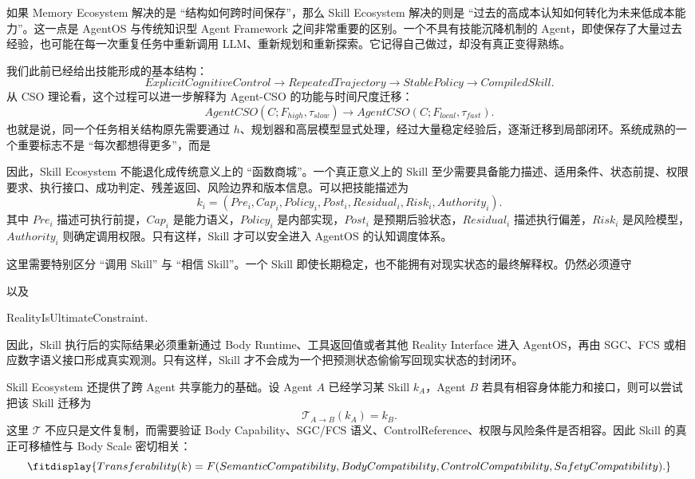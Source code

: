 如果 Memory Ecosystem 解决的是 ``结构如何跨时间保存''，那么 Skill Ecosystem 解决的则是 ``过去的高成本认知如何转化为未来低成本能力''。这一点是 AgentOS 与传统知识型 Agent Framework 之间非常重要的区别。一个不具有技能沉降机制的 Agent，即使保存了大量过去经验，也可能在每一次重复任务中重新调用 LLM、重新规划和重新探索。它记得自己做过，却没有真正变得熟练。

我们此前已经给出技能形成的基本结构：
\[
ExplicitCognitiveControl
\rightarrow
RepeatedTrajectory
\rightarrow
StablePolicy
\rightarrow
CompiledSkill.
\]
从 CSO 理论看，这个过程可以进一步解释为 Agent-CSO 的功能与时间尺度迁移：
\[
AgentCSO(C;F_{high},\tau_{slow})
\rightarrow
AgentCSO(C;F_{local},\tau_{fast}).
\]
也就是说，同一个任务相关结构原先需要通过 $h$、规划器和高层模型显式处理，经过大量稳定经验后，逐渐迁移到局部闭环。系统成熟的一个重要标志不是 ``每次都想得更多''，而是
\begin{statementbox}
\centering
{}
\end{statementbox}

因此，Skill Ecosystem 不能退化成传统意义上的 ``函数商城''。一个真正意义上的 Skill 至少需要具备能力描述、适用条件、状态前提、权限要求、执行接口、成功判定、残差返回、风险边界和版本信息。可以把技能描述为
\[
k_i
=
(
Pre_i,
Cap_i,
Policy_i,
Post_i,
Residual_i,
Risk_i,
Authority_i
).
\]
其中 $Pre_i$ 描述可执行前提，$Cap_i$ 是能力语义，$Policy_i$ 是内部实现，$Post_i$ 是预期后验状态，$Residual_i$ 描述执行偏差，$Risk_i$ 是风险模型，$Authority_i$ 则确定调用权限。只有这样，Skill 才可以安全进入 AgentOS 的认知调度体系。

这里需要特别区分 ``调用 Skill'' 与 ``相信 Skill''。一个 Skill 即使长期稳定，也不能拥有对现实状态的最终解释权。仍然必须遵守
\begin{statementbox}
\centering
{}
\end{statementbox}
以及
\begin{statementbox}
RealityIsUltimateConstraint.
\end{statementbox}
因此，Skill 执行后的实际结果必须重新通过 Body Runtime、工具返回值或者其他 Reality Interface 进入 AgentOS，再由 SGC、FCS 或相应数字语义接口形成真实观测。只有这样，Skill 才不会成为一个把预测状态偷偷写回现实状态的封闭环。

Skill Ecosystem 还提供了跨 Agent 共享能力的基础。设 Agent $A$ 已经学习某 Skill $k_A$，Agent $B$ 若具有相容身体能力和接口，则可以尝试把该 Skill 迁移为
\[
\mathcal T_{A\rightarrow B}(k_A)
=
k_B.
\]
这里 $\mathcal T$ 不应只是文件复制，而需要验证 Body Capability、SGC/FCS 语义、ControlReference、权限与风险条件是否相容。因此 Skill 的真正可移植性与 Body Scale 密切相关：
\[
\fitdisplay{
Transferability(k)
=
F(
SemanticCompatibility,
BodyCompatibility,
ControlCompatibility,
SafetyCompatibility
).
}
\]

